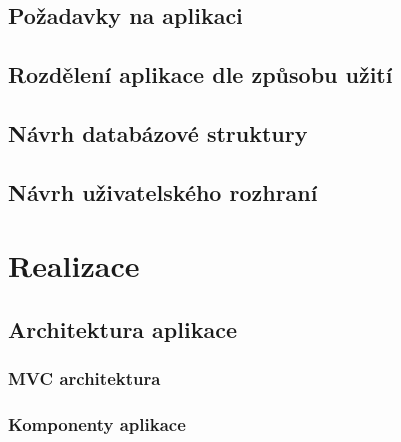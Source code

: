 \documentclass[czech,BP]{thesiskiv}
\begin{document}
	\subsection{Požadavky na aplikaci}
	\subsection{Rozdělení aplikace dle způsobu užití}
	\subsection{Návrh databázové struktury}
	\subsection{Návrh uživatelského rozhraní}
\section{Realizace}
	\subsection{Architektura aplikace}
		\subsubsection{MVC architektura}
		\subsubsection{Komponenty aplikace}
% 
%

{\raggedright\small

}
\end{document}

